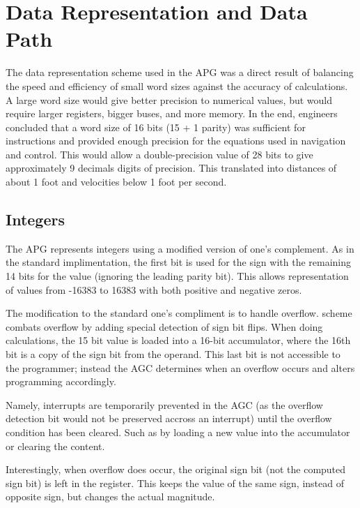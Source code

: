 \documentclass[a4paper,11pt]{article}
\begin{document}

\section{Data Representation and Data Path}
The data representation scheme used in the APG was a direct result of balancing the speed and efficiency of small word sizes against the accuracy of calculations.  A large word size would give better precision to numerical values, but would require larger registers, bigger buses, and more memory.  In the end, engineers concluded that a word size of 16 bits (15 + 1 parity) was sufficient for instructions and provided enough precision for the equations used in navigation and control. This would allow a double-precision value of 28 bits to give approximately 9 decimals digits of precision.  This translated into distances of about 1 foot and velocities below 1 foot per second.  

\subsection{Integers}
The APG represents integers using a modified version of one's complement. As in the standard implimentation, the first bit is used for the sign with the remaining 14 bits for the value (ignoring the leading parity bit).  This allows representation of values from -16383 to 16383 with both positive and negative zeros.

The modification to the standard one's compliment is to handle overflow.   scheme combats overflow by adding special detection of sign bit flips.  When doing calculations, the 15 bit value is loaded into a 16-bit accumulator, where the 16th bit is a copy of the sign bit from the operand.  This last bit is not accessible to the programmer; instead the AGC determines when an overflow occurs and alters programming accordingly.  

Namely, interrupts are temporarily prevented in the AGC (as the overflow detection bit would not be preserved accross an interrupt) until the overflow condition has been cleared.  Such as by loading a new value into the accumulator or clearing the content.  

Interestingly, when overflow does occur, the original sign bit (not the computed sign bit) is left in the register.  This keeps the value of the same sign, instead of opposite sign, but changes the actual magnitude.  
\end{document}
